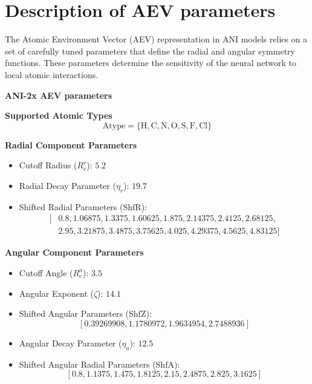 \chapter{Description of AEV parameters}
\label{appendix:AEV_param}

The Atomic Environment Vector (AEV) representation in ANI models relies on a set of carefully tuned parameters that define the radial and angular symmetry functions. These parameters determine the sensitivity of the neural network to local atomic interactions.
\begin{center}
\textbf{ANI-2x AEV parameters}
\end{center}

\textbf{Supported Atomic Types}
\begin{equation}
\text{Atype} = \{ \text{H}, \text{C}, \text{N}, \text{O}, \text{S}, \text{F}, \text{Cl}\}
\end{equation}

\textbf{Radial Component Parameters}
\begin{itemize}
    \item Cutoff Radius (\( R_c^r \)): \( 5.2 \) \angstrom
    \item Radial Decay Parameter (\( \eta_r \)): \( 19.7 \)
    \item Shifted Radial Parameters (\( \text{ShfR} \)):  
    \begin{equation}
        \begin{aligned}
        \big[ &0.8, 1.06875, 1.3375, 1.60625, 1.875, 2.14375, 2.4125, 2.68125, \\
             &2.95, 3.21875, 3.4875, 3.75625, 4.025, 4.29375, 4.5625, 4.83125 \big]
        \end{aligned}
    \end{equation}
\end{itemize}

\textbf{Angular Component Parameters}
\begin{itemize}
    \item Cutoff Angle (\( R_c^a \)): \( 3.5 \) \angstrom
    \item Angular Exponent (\( \zeta \)): \( 14.1 \)
    \item Shifted Angular Parameters (\( \text{ShfZ} \)):  
    \begin{equation}
    \left[ 0.39269908, 1.1780972, 1.9634954, 2.7488936 \right]
    \end{equation}
    \item Angular Decay Parameter (\( \eta_a \)): \( 12.5 \)
    \item Shifted Angular Radial Parameters (\( \text{ShfA} \)):  
    \begin{equation}
    \left[ 0.8, 1.1375, 1.475, 1.8125, 2.15, 2.4875, 2.825, 3.1625 \right]
    \end{equation}
\end{itemize}

